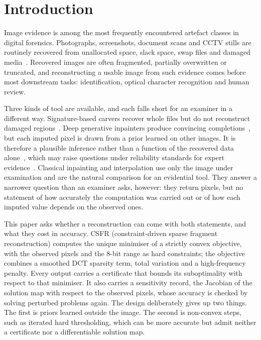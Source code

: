 \documentclass[final,3p]{elsarticle}
\begin{document}
\section{Introduction}
\label{sec:intro}

Image evidence is among the most frequently encountered artefact classes in digital forensics. Photographs, screenshots, document scans and CCTV stills are routinely recovered from unallocated space, slack space, swap files and damaged media~\cite{carrier2005forensics,casey2011digital,garfinkel2007carving}. Recovered images are often fragmented, partially overwritten or truncated, and reconstructing a usable image from such evidence comes before most downstream tasks: identification, optical character recognition and human review.

Three kinds of tool are available, and each falls short for an examiner in a different way. Signature-based carvers recover whole files but do not reconstruct damaged regions~\cite{pal2009evolution,garfinkel2007carving}. Deep generative inpainters produce convincing completions~\cite{yu2018generative,suvorov2022resolution,ho2020denoising,rombach2022high,lugmayr2022repaint}, but each imputed pixel is drawn from a prior learned on other images. It is therefore a plausible inference rather than a function of the recovered data alone~\cite{bhadra2021hallucinations,horsman2024sources,arslan2024reliability}, which may raise questions under reliability standards for expert evidence~\cite{daubert1993}. Classical inpainting and interpolation use only the image under examination and are the natural comparison for an evidential tool. They answer a narrower question than an examiner asks, however: they return pixels, but no statement of how accurately the computation was carried out or of how each imputed value depends on the observed ones.

This paper asks whether a reconstruction can come with both statements, and what they cost in accuracy. CSFR (constraint-driven sparse fragment reconstruction) computes the unique minimiser of a strictly convex objective, with the observed pixels and the 8-bit range as hard constraints; the objective combines a smoothed DCT sparsity term, total variation and a high-frequency penalty. Every output carries a certificate that bounds its suboptimality with respect to that minimiser. It also carries a sensitivity record, the Jacobian of the solution map with respect to the observed pixels, whose accuracy is checked by solving perturbed problems again. The design deliberately gives up two things. The first is priors learned outside the image. The second is non-convex steps, such as iterated hard thresholding, which can be more accurate but admit neither a certificate nor a differentiable solution map.
\end{document}
